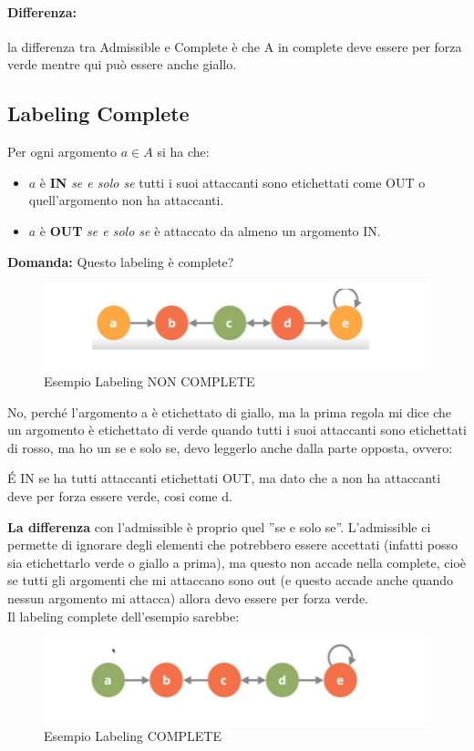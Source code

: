 \paragraph{Differenza:} la differenza tra Admissible e Complete
è che A in complete deve essere per forza verde mentre qui può essere anche
giallo.

\subsection{Labeling Complete}
Per ogni argomento $a \in A$ si ha che:
\begin{itemize}
    \item  $a$ è \textbf{IN} \textit{se e solo se} tutti i suoi attaccanti
          sono etichettati come OUT o quell'argomento non ha attaccanti.
    \item $a$ è \textbf{OUT} \textit{se e solo se} è attaccato da almeno un
          argomento IN.
\end{itemize}
\textbf{Domanda: } Questo labeling è complete?
\begin{figure}[H]
    \centering
    \includegraphics[width=12cm, keepaspectratio]{capitoli/img/Cap7/LC.png}
    \caption{Esempio Labeling NON COMPLETE}
\end{figure}
No, perché l'argomento a è etichettato di giallo, ma la prima regola mi
dice che un argomento è etichettato di verde quando tutti i suoi attaccanti
sono etichettati di rosso, ma ho un se e solo se, devo leggerlo anche dalla
parte opposta, ovvero:

\vspace{0.3cm}
\noindent É IN se ha tutti attaccanti etichettati OUT, ma dato che a non ha
attaccanti deve per forza essere verde, cosi come d.

\vspace{0.3cm}

\noindent \textbf{La differenza} con l'admissible è proprio quel ”se e solo
se”. L'admissible ci permette di ignorare degli elementi che potrebbero
essere accettati (infatti posso sia etichettarlo verde o giallo a prima), ma
questo non accade nella complete, cioè se tutti gli argomenti che mi
attaccano sono out (e questo accade anche quando nessun argomento mi
attacca) allora devo essere per forza verde. \\
Il labeling complete dell'esempio sarebbe:
\begin{figure}[H]
    \centering
    \includegraphics[width=12cm, keepaspectratio]{capitoli/img/Cap7/LC2.png}
    \caption{Esempio Labeling COMPLETE}
\end{figure}


